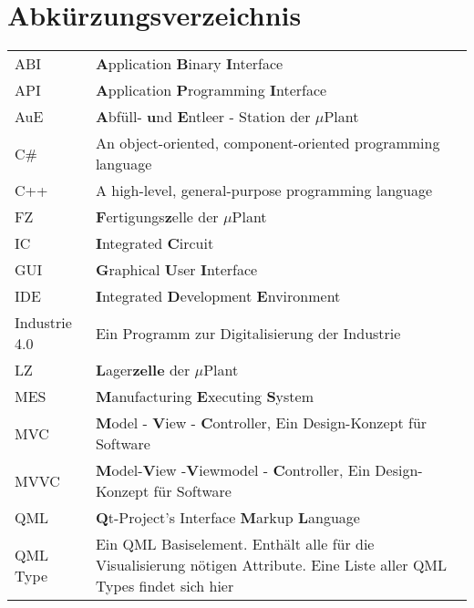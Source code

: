 \chapter*{Abkürzungsverzeichnis}

\begin{center}
	
	\renewcommand{\arraystretch}{1.1}
	\begin{supertabular}{p{2.1cm}p{10.9cm}}
		ABI       & \textbf{A}pplication \textbf{B}inary \textbf{I}nterface \\
		API	      & \textbf{A}pplication \textbf{P}rogramming \textbf{I}nterface \\
		AuE       & \textbf{A}bfüll- \textbf{u}nd \textbf{E}ntleer - Station der $\mu$Plant \\
		C\#       & An object-oriented, component-oriented programming language \\
		C++       & A high-level, general-purpose programming language \\
		FZ        & \textbf{F}ertigungs\textbf{z}elle der $\mu$Plant \\
		IC 	 	  & \textbf{I}ntegrated \textbf{C}ircuit \\
		GUI       & \textbf{G}raphical \textbf{U}ser \textbf{I}nterface \\
		IDE		  & \textbf{I}ntegrated \textbf{D}evelopment \textbf{E}nvironment \\
		Industrie 4.0 & Ein Programm zur Digitalisierung der Industrie \\
		LZ        & \textbf{L}ager\textbf{zelle} der $\mu$Plant \\
		MES       & \textbf{M}anufacturing \textbf{E}xecuting \textbf{S}ystem \\
		MVC       & \textbf{M}odel - \textbf{V}iew - \textbf{C}ontroller, Ein Design-Konzept für Software \\
		MVVC      & \textbf{M}odel-\textbf{V}iew -\textbf{V}iewmodel - \textbf{C}ontroller, Ein Design-Konzept für Software \\
		QML       & \textbf{Q}t-Project's Interface \textbf{M}arkup \textbf{L}anguage \\
		QML Type  & Ein QML Basiselement. Enthält alle für die Visualisierung nötigen Attribute. Eine Liste aller QML Types findet sich hier \cite{qmlTypeList} \\

\end{supertabular}
\end{center}
